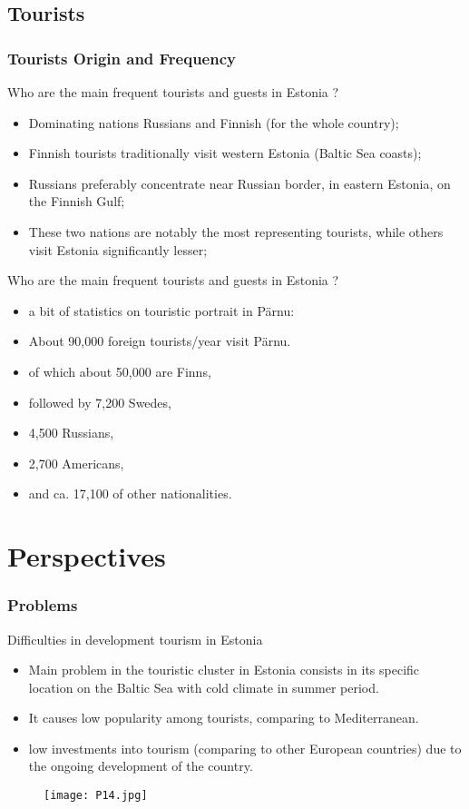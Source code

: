 \documentclass[pdflatex,compress,8pt,
	xcolor={dvipsnames,dvipsnames,svgnames,x11names,table},
	hyperref={	
	breaklinks = true, 
	pdfauthor={Lemenkova Polina}, 
	pdfsubject={Preentation}, 
	pdfcreator={Lemenkova Polina}, 
	pdfproducer={Lemenkova Polina}, 
	colorlinks=true,
	linkcolor=Tomato, 
	citecolor=DeepPink3, 
	urlcolor = NavyBlue, 
	breaklinks = true}]{beamer}
\begin{document}
\subsection{Tourists}
\begin{frame}\frametitle{Tourists Origin and Frequency}
Who are the main frequent tourists and guests in Estonia ?
\begin{itemize}
	\item Dominating nations Russians and Finnish (for the whole country);
	\item Finnish tourists traditionally visit western Estonia (Baltic Sea coasts);
	\item Russians preferably concentrate near Russian border, in eastern Estonia, on the Finnish Gulf;
	\item These two nations are notably the most representing tourists, while others visit Estonia significantly lesser;
\end{itemize}
Who are the main frequent tourists and guests in Estonia ?
\begin{itemize}
	\item a bit of statistics on touristic portrait in Pärnu:
	\item About 90,000 foreign tourists/year visit Pärnu. 
	\item of which about 50,000 are Finns,
	\item followed by 7,200 Swedes,
	\item 4,500 Russians,
	\item 2,700 Americans,
	\item and ca. 17,100 of other nationalities.
\end{itemize}
\end{frame}

\section{Perspectives}
\begin{frame}\frametitle{Problems}
Difficulties in development tourism in Estonia
\begin{itemize}
	\item Main problem in the touristic cluster in Estonia consists in its specific location on the Baltic Sea with cold climate in summer period. 
	\item It causes low popularity among tourists, comparing to Mediterranean.
	\item low investments into tourism (comparing to other European countries) due to the ongoing development of the country.
\end{itemize}
\begin{figure}[H]
	\centering
		\texttt{[image: P14.jpg]}
\end{figure}
\end{frame}
\end{document}
